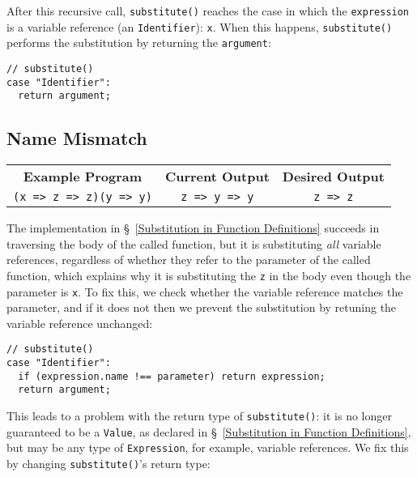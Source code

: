 \documentclass[12pt, oneside]{book}
\begin{document}
After this recursive call, \texttt{substitute()} reaches the case in which the \texttt{expression} is a variable reference (an \texttt{Identifier}): \texttt{x}. When this happens, \texttt{substitute()} performs the substitution by returning the \texttt{argument}:

\begin{verbatim}
// substitute()
case "Identifier":
  return argument;
\end{verbatim}

\subsection{Name Mismatch}

\begin{center}
\begin{tabular}{c|c|c}
\textbf{Example Program} & \textbf{Current Output} & \textbf{Desired Output} \\
\texttt{(x => z => z)(y => y)} & \texttt{z => y => y} & \texttt{z => z} \\
\end{tabular}
\end{center}

\noindent The implementation in §~\ref{Substitution in Function Definitions} succeeds in traversing the body of the called function, but it is substituting \emph{all} variable references, regardless of whether they refer to the parameter of the called function, which explains why it is substituting the \texttt{z} in the body even though the parameter is \texttt{x}. To fix this, we check whether the variable reference matches the parameter, and if it does not then we prevent the substitution by retuning the variable reference unchanged:

\begin{verbatim}
// substitute()
case "Identifier":
  if (expression.name !== parameter) return expression;
  return argument;
\end{verbatim}

This leads to a problem with the return type of \texttt{substitute()}: it is no longer guaranteed to be a \texttt{Value}, as declared in §~\ref{Substitution in Function Definitions}, but may be any type of \texttt{Expression}, for example, variable references. We fix this by changing \texttt{substitute()}’s return type:
\end{document}
